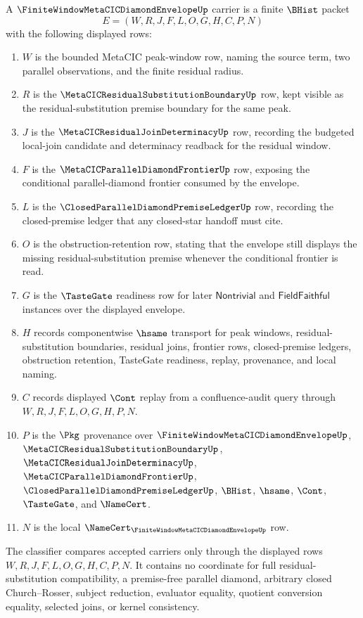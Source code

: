 \begin{definition}
\label{def:finite-window-metacic-diamond-envelope-carrier}
A $\FiniteWindowMetaCICDiamondEnvelopeUp$ carrier is a finite $\BHist$ packet
$$
E=(W,R,J,F,L,O,G,H,C,P,N)
$$
with the following displayed rows:
\begin{enumerate}
\item $W$ is the bounded MetaCIC peak-window row, naming the source term, two parallel observations, and the finite residual radius.
\item $R$ is the $\MetaCICResidualSubstitutionBoundaryUp$ row, kept visible as the residual-substitution premise boundary for the same peak.
\item $J$ is the $\MetaCICResidualJoinDeterminacyUp$ row, recording the budgeted local-join candidate and determinacy readback for the residual window.
\item $F$ is the $\MetaCICParallelDiamondFrontierUp$ row, exposing the conditional parallel-diamond frontier consumed by the envelope.
\item $L$ is the $\ClosedParallelDiamondPremiseLedgerUp$ row, recording the closed-premise ledger that any closed-star handoff must cite.
\item $O$ is the obstruction-retention row, stating that the envelope still displays the missing residual-substitution premise whenever the conditional frontier is read.
\item $G$ is the $\TasteGate$ readiness row for later $\mathsf{Nontrivial}$ and $\mathsf{FieldFaithful}$ instances over the displayed envelope.
\item $H$ records componentwise $\hsame$ transport for peak windows, residual-substitution boundaries, residual joins, frontier rows, closed-premise ledgers, obstruction retention, TasteGate readiness, replay, provenance, and local naming.
\item $C$ records displayed $\Cont$ replay from a confluence-audit query through $W,R,J,F,L,O,G,H,P,N$.
\item $P$ is the $\Pkg$ provenance over $\FiniteWindowMetaCICDiamondEnvelopeUp$, $\MetaCICResidualSubstitutionBoundaryUp$, $\MetaCICResidualJoinDeterminacyUp$, $\MetaCICParallelDiamondFrontierUp$, $\ClosedParallelDiamondPremiseLedgerUp$, $\BHist$, $\hsame$, $\Cont$, $\TasteGate$, and $\NameCert$.
\item $N$ is the local $\NameCert_{\FiniteWindowMetaCICDiamondEnvelopeUp}$ row.
\end{enumerate}
The classifier compares accepted carriers only through the displayed rows $W,R,J,F,L,O,G,H,C,P,N$. It contains no coordinate for full residual-substitution compatibility, a premise-free parallel diamond, arbitrary closed Church--Rosser, subject reduction, evaluator equality, quotient conversion equality, selected joins, or kernel consistency.
\end{definition}

